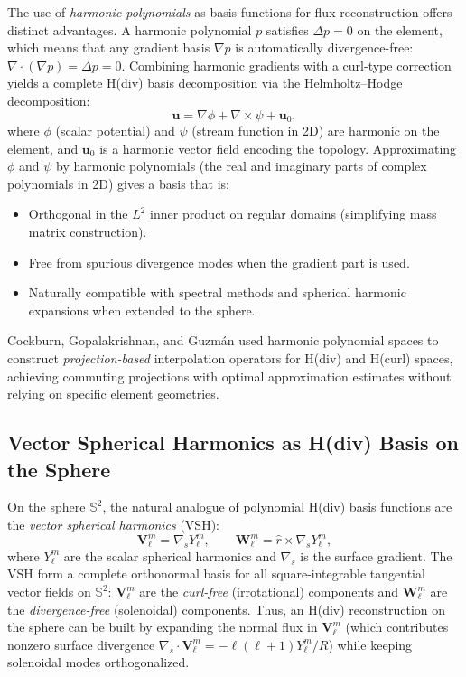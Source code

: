 The use of \emph{harmonic polynomials} as basis functions for flux
reconstruction offers distinct advantages. A harmonic polynomial
$p$ satisfies $\Delta p = 0$ on the element, which means that any
gradient basis $\nabla p$ is automatically divergence-free:
$\nabla\cdot(\nabla p) = \Delta p = 0$. Combining harmonic gradients with a
curl-type correction yields a complete H(div) basis decomposition via the
Helmholtz--Hodge decomposition:
\[
  \mathbf{u} = \nabla \phi + \nabla\times\psi + \mathbf{u}_0,
\]
where $\phi$ (scalar potential) and $\psi$ (stream function in 2D) are
harmonic on the element, and $\mathbf{u}_0$ is a harmonic vector field
encoding the topology. Approximating $\phi$ and $\psi$ by harmonic
polynomials (the real and imaginary parts of complex polynomials in 2D)
gives a basis that is:
\begin{itemize}[nosep]
  \item Orthogonal in the $L^2$ inner product on regular domains (simplifying
        mass matrix construction).
  \item Free from spurious divergence modes when the gradient part is used.
  \item Naturally compatible with spectral methods and spherical harmonic
        expansions when extended to the sphere.
\end{itemize}
Cockburn, Gopalakrishnan, and Guzm\'{a}n \cite{cockburnHarmonic2010} used
harmonic polynomial spaces to construct \emph{projection-based} interpolation
operators for H(div) and H(curl) spaces, achieving commuting projections
with optimal approximation estimates without relying on specific element
geometries.

\subsection{Vector Spherical Harmonics as H(div) Basis on the Sphere}

On the sphere $\mathbb{S}^2$, the natural analogue of polynomial H(div) basis
functions are the \emph{vector spherical harmonics} (VSH):
\[
  \mathbf{V}_\ell^m = \nabla_s Y_\ell^m, \qquad
  \mathbf{W}_\ell^m = \hat{r}\times\nabla_s Y_\ell^m,
\]
where $Y_\ell^m$ are the scalar spherical harmonics and $\nabla_s$ is the
surface gradient. The VSH form a complete orthonormal basis for all
square-integrable tangential vector fields on $\mathbb{S}^2$:
$\mathbf{V}_\ell^m$ are the \emph{curl-free} (irrotational) components and
$\mathbf{W}_\ell^m$ are the \emph{divergence-free} (solenoidal) components.
Thus, an H(div) reconstruction on the sphere can be built by expanding
the normal flux in $\mathbf{V}_\ell^m$ (which contributes nonzero
surface divergence $\nabla_s\cdot\mathbf{V}_\ell^m =
-\ell(\ell+1)Y_\ell^m/R$) while keeping solenoidal modes orthogonalized.


